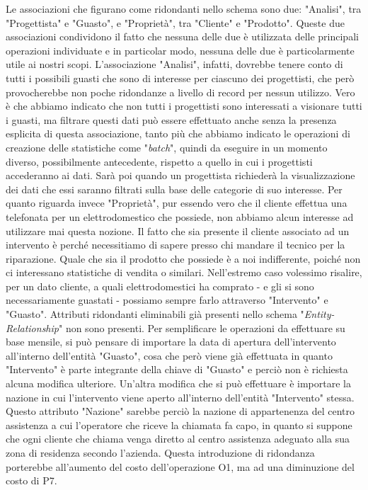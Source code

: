 \documentclass[a4paper, 12pt]{report}
\begin{document}
Le associazioni che figurano come ridondanti nello schema sono due: "Analisi", tra "Progettista" e "Guasto", e "Proprietà", tra "Cliente" e "Prodotto". Queste due associazioni
condividono il fatto che nessuna delle due è utilizzata delle principali operazioni individuate e in particolar modo, nessuna delle due è particolarmente utile ai nostri scopi.\newline
L'associazione "Analisi", infatti, dovrebbe tenere conto di tutti i possibili guasti che sono di interesse per ciascuno dei progettisti, che però provocherebbe non poche ridondanze
a livello di record per nessun utilizzo. Vero è che abbiamo indicato che non tutti i progettisti sono interessati a visionare tutti i guasti, ma filtrare questi dati può essere effettuato
anche senza la presenza esplicita di questa associazione, tanto più che abbiamo indicato le operazioni di creazione delle statistiche come "\textit{batch}", quindi da eseguire in
un momento diverso, possibilmente antecedente, rispetto a quello in cui i progettisti accederanno ai dati. Sarà poi quando un progettista richiederà la visualizzazione dei dati che
essi saranno filtrati sulla base delle categorie di suo interesse.\newline
Per quanto riguarda invece "Proprietà", pur essendo vero che il cliente effettua una telefonata per un elettrodomestico che possiede, non abbiamo alcun interesse ad utilizzare mai
questa nozione. Il fatto che sia presente il cliente associato ad un intervento è perché necessitiamo di sapere presso chi mandare il tecnico per la riparazione. Quale che sia il prodotto
che possiede è a noi indifferente, poiché non ci interessano statistiche di vendita o similari. Nell'estremo caso volessimo risalire, per un dato cliente, a quali elettrodomestici
ha comprato - e gli si sono necessariamente guastati - possiamo sempre farlo attraverso "Intervento" e "Guasto".\newline
Attributi ridondanti eliminabili già presenti nello schema "\textit{Entity-Relationship}" non sono presenti. Per semplificare le operazioni da effettuare su base mensile, si può pensare di importare la data di apertura dell'intervento all'interno dell'entità "Guasto", cosa che però viene già effettuata in quanto "Intervento" è parte integrante della chiave di "Guasto" e perciò
non è richiesta alcuna modifica ulteriore.\newline
Un'altra modifica che si può effettuare è importare la nazione in cui l'intervento viene aperto all'interno dell'entità "Intervento" stessa. Questo attributo "Nazione" sarebbe perciò
la nazione di appartenenza del centro assistenza a cui l'operatore che riceve la chiamata fa capo, in quanto si suppone che ogni cliente che chiama venga diretto al centro assistenza 
adeguato alla sua zona di residenza secondo l'azienda. Questa introduzione di ridondanza porterebbe all'aumento del costo dell'operazione O1, ma ad una diminuzione del costo di P7.
\end{document}
